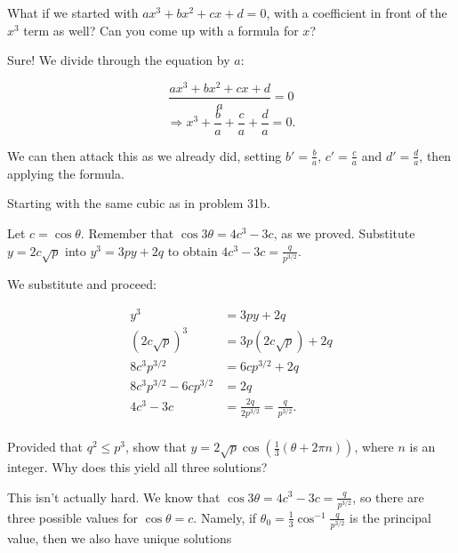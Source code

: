 \documentclass[../key.tex]{subfiles}
\begin{document}
\begin{inner_problem}
\item What if we started with $ax^3+bx^2+cx+d=0$, with a coefficient in front of the $x^3$ term as well? Can you come up with a formula for $x$?
\end{inner_problem}

Sure! We divide through the equation by $a$:

$$\frac{ax^3+bx^2+cx+d}{a}=0$$
$$\Longrightarrow x^3 + \frac{b}{a} + \frac{c}{a} + \frac{d}{a} = 0.$$

We can then attack this as we already did, setting $b'=\frac{b}{a}$, $c'=\frac{c}{a}$ and $d'=\frac{d}{a}$, then applying the formula.

\begin{outer_problem}
\item Starting with the same cubic as in problem 31b.
\end{outer_problem}

\begin{inner_problem}[start=1]
\item Let $c=\cos\theta$. Remember that $\cos 3\theta=4c^3-3c$, as we proved. Substitute $y=2c\sqrt{p}$ into $y^3=3py+2q$ to obtain $4c^3-3c=\frac{q}{p^{3/2}}$.
\end{inner_problem}

We substitute and proceed:

\begin{align*}
y^3 &= 3py+2q \\
(2c\sqrt{p})^3 &= 3p(2c\sqrt{p}) + 2q \\
8c^3 p^{3/2} &= 6c p^{3/2} + 2q \\
8c^3 p^{3/2} - 6c p^{3/2} &= 2q \\
4c^3 - 3c &= \frac{2q}{2p^{3/2}} = \frac{q}{p^{3/2}}. \\
\end{align*}

\begin{inner_problem}
\item Provided that $q^2\leq p^3$, show that $y=2\sqrt{p}\cos\left(\frac{1}{3}(\theta+2\pi n)\right)$, where $n$ is an integer. Why does this yield all three solutions?
\end{inner_problem}

This isn't actually hard. We know that $\cos 3\theta = 4c^3-3c = \frac{q}{p^{3/2}}$, so there are three possible values for $\cos\theta = c$. Namely, if $\theta_0 = \frac{1}{3}\cos^{-1} \frac{q}{p^{3/2}}$ is the principal value, then we also have unique solutions
\end{document}
